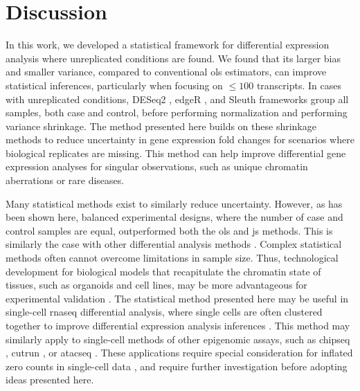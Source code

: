 \section{Discussion}

In this work, we developed a statistical framework for differential expression analysis where unreplicated conditions are found.
We found that its larger bias and smaller variance, compared to conventional \gls{ols} estimators, can improve statistical inferences, particularly when focusing on $\le 100$ transcripts.
In cases with unreplicated conditions, DESeq2 \cite{loveModeratedEstimationFold2014}, edgeR \cite{robinsonEdgeRBioconductorPackage2010}, and Sleuth \cite{pimentelDifferentialAnalysisRNAseq2017,yiGenelevelDifferentialAnalysis2018} frameworks group all samples, both case and control, before performing normalization and performing variance shrinkage.
The method presented here builds on these shrinkage methods to reduce uncertainty in gene expression fold changes for scenarios where biological replicates are missing.
This method can help improve differential gene expression analyses for singular observations, such as unique chromatin aberrations or rare diseases.

Many statistical methods exist to similarly reduce uncertainty.
However, as has been shown here, balanced experimental designs, where the number of case and control samples are equal, outperformed both the \gls{ols} and \gls{js} methods.
This is similarly the case with other differential analysis methods \cite{schurchHowManyBiological2016,gierlinskiStatisticalModelsRNAseq2015}.
Complex statistical methods often cannot overcome limitations in sample size.
Thus, technological development for biological models that recapitulate the chromatin state of tissues, such as organoids and cell lines, may be more advantageous for experimental validation \cite{zanoniModelingNeoplasticDisease2020}.
The statistical method presented here may be useful in single-cell \gls{rnaseq} differential analysis, where single cells are often clustered together to improve differential expression analysis inferences \cite{chenAssessmentComputationalMethods2019}.
This method may similarly apply to single-cell methods of other epigenomic assays,  such as \gls{chipseq} \cite{rotemSinglecellChIPseqReveals2015}, \gls{cutrun} \cite{hainerProfilingPluripotencyFactors2019}, or \gls{atacseq} \cite{buenrostroSinglecellChromatinAccessibility2015}.
These applications require special consideration for inflated zero counts in single-cell data \cite{chenAssessmentComputationalMethods2019}, and require further investigation before adopting ideas presented here.
